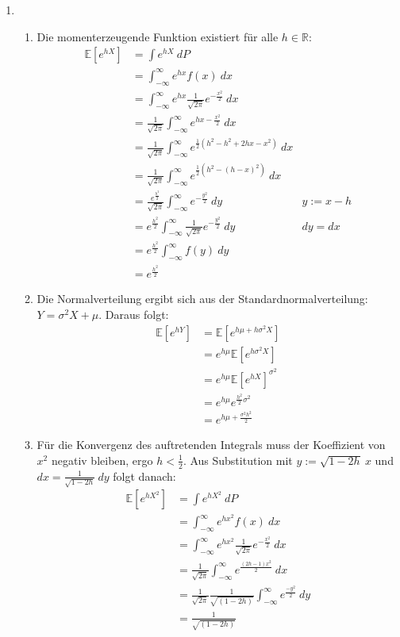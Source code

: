 \documentclass[11pt,a4paper,fullpage]{article}
\newcommand{\E}{\mathbb E}
\newcommand{\R}{\mathbb R}
\begin{document}
\begin{enumerate}
\item
\begin{enumerate}
\item Die momenterzeugende Funktion existiert für alle $h \in \R$:
\begin{align*}
\E\left[e^{hX}\right] &= \int e^{hX} ~dP \\
&= \int_{-\infty}^\infty e^{hx} f\left(x\right) ~dx \\
&= \int_{-\infty}^\infty e^{hx} \frac{1}{\sqrt{2\pi}} e^{-\frac{x^2}{2}} ~dx \\
&= \frac{1}{\sqrt{2\pi}} \int_{-\infty}^\infty e^{hx-\frac{x^2}{2}} ~dx \\
&= \frac{1}{\sqrt{2\pi}} \int_{-\infty}^\infty e^{\frac{1}{2} \left(h^2 - h^2 + 2hx - x^2\right)} ~dx \\
&= \frac{1}{\sqrt{2\pi}} \int_{-\infty}^\infty e^{\frac{1}{2} \left(h^2 - \left(h - x\right)^2\right)} ~dx \\
&= \frac{e^{\frac{h^2}{2}}}{\sqrt{2\pi}} \int_{-\infty}^\infty e^{-\frac{y^2}{2}} ~dy  &y := x - h\\
&= e^{\frac{h^2}{2}} \int_{-\infty}^\infty \frac{1}{\sqrt{2\pi}} e^{-\frac{y^2}{2}} ~dy  &dy = dx\\
&= e^{\frac{h^2}{2}} \int_{-\infty}^\infty f\left(y\right) ~dy\\
&= e^{\frac{h^2}{2}}
\end{align*}
\item Die Normalverteilung ergibt sich aus der Standardnormalverteilung: $Y = \sigma^2 X + \mu$. Daraus folgt:
\begin{align*}
\E\left[e^{hY}\right] &= \E\left[e^{h\mu + h\sigma^2 X}\right] \\
&= e^{h\mu} \E\left[e^{h\sigma^2 X}\right] \\
&= e^{h\mu} \E\left[e^{hX}\right]^{\sigma^2} \\
&= e^{h\mu} e^{\frac{h^2}{2} \sigma^2} \\
&= e^{h\mu + \frac{\sigma^2 h^2}{2}}
\end{align*}
\item Für die Konvergenz des auftretenden Integrals muss der Koeffizient von $x^2$ negativ bleiben, ergo $h < \frac{1}{2}$. Aus Substitution mit $y := \sqrt{1-2h}~x$ und $dx = \frac{1}{\sqrt{1-2h}}~dy$ folgt danach:
\begin{align*}
\E\left[e^{hX^2}\right] &= \int e^{hX^2} ~dP \\
&= \int_{-\infty}^\infty e^{hx^2} f\left(x\right) ~dx \\
&= \int_{-\infty}^\infty e^{hx^2} \frac{1}{\sqrt{2\pi}} e^{-\frac{x^2}{2}} ~dx \\
&= \frac{1}{\sqrt{2\pi}} \int_{-\infty}^\infty e^{\frac{\left(2h - 1\right)x^2}{2}} ~dx \\
&= \frac{1}{\sqrt{2\pi}}\frac{1}{\sqrt{\left(1-2h\right)}} \int_{-\infty}^\infty e^{\frac{-y^2}{2}} ~dy \\
&= \frac{1}{\sqrt{\left(1-2h\right)}}
\end{align*}
\end{enumerate}


\end{enumerate}
\end{document}
